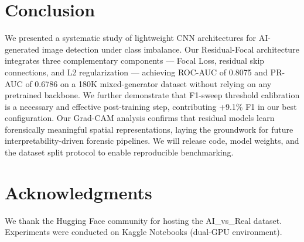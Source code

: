 \documentclass[10pt,twocolumn]{article}
\begin{document}
\section{Conclusion}
\label{sec:conclusion}

We presented a systematic study of lightweight CNN architectures for AI-generated
image detection under class imbalance. Our Residual-Focal architecture integrates
three complementary components --- Focal Loss, residual skip connections, and
L2 regularization --- achieving ROC-AUC of 0.8075 and PR-AUC of 0.6786 on a
180K mixed-generator dataset without relying on any pretrained backbone.
We further demonstrate that F1-sweep threshold calibration is a necessary and
effective post-training step, contributing +9.1\% F1 in our best configuration.
Our Grad-CAM analysis confirms that residual models learn forensically meaningful
spatial representations, laying the groundwork for future interpretability-driven
forensic pipelines. We will release code, model weights, and the dataset split
protocol to enable reproducible benchmarking.

\section*{Acknowledgments}
We thank the Hugging Face community for hosting the AI\_vs\_Real dataset.
Experiments were conducted on Kaggle Notebooks (dual-GPU environment).
\end{document}
